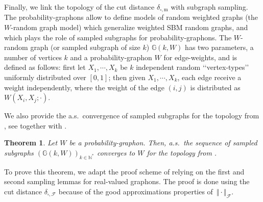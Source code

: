 \documentclass{amsart}
\newcommand{\as}{a.s.\ }
\theoremstyle{plain}
\newtheorem{theo}[Th]{Theorem}
\theoremstyle{definition}
\newcommand{\bbG}{\mathbb{G}}
\newcommand{\m}{\mathrm{m}}
\newcommand{\ddcut}{\delta_{\square,\m}}
\newcommand{\NmeasFSymbol}{\Vert\cdot\Vert_{\mathcal{F}}}
\newcommand{\ddcutF}{\delta_{\square,\mathcal{F}}}
\newcommand{\N}{\mathbb{N}}
\begin{document}
Finally, we link the topology of the cut distance $\ddcut$ with subgraph
sampling.   The probability-graphons  allow to  define models  of random
weighted graphs  (the $W$-random graph model)  which generalize weighted
SBM random  graphs, and which  plays the  role of sampled  subgraphs for
probability-graphons.  The $W$-random graph (or sampled subgraph of size
$k$) $\mathbb{G}(k,W)$ has two parameters,  a number of vertices $k$ and
a probability-graphon $W$ for edge-weights,  and is defined as follows:
first let $X_1, \cdots, X_k$  be $k$ independent random ‘‘vertex-types’’
uniformly distributed over $[0,1]$; then  given $X_1, \cdots, X_k$, each
edge receive a  weight independently, where the weight of  the edge $(i,j)$
is distributed as $W(X_i, X_j; \cdot)$.
	
  
We also  provide the \as convergence of  sampled subgraphs for
the topology from ,
see  
together with .

\begin{theo}
Let $W$ be a probability-graphon.
Then, \as the sequence of sampled subgraphs $(\bbG(k,W))_{k\in\N^*}$
	converges to $W$ for 
 	 the topology  from .
\end{theo}

To prove this theorem, we adapt  the proof scheme of \cite[Sections 10.5
and 10.6]{Lovasz}  relying on the  first and second sampling  lemmas for
real-valued  graphons.   The  proof  is  done  using  the  cut  distance
$\ddcutF$    because    of    the   good    approximations    properties
of~$\NmeasFSymbol$.
\end{document}

